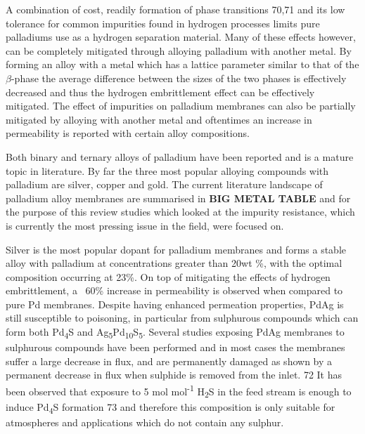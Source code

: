 A combination of cost, readily formation of phase transitions 70,71 and its low tolerance for 
common impurities found in hydrogen processes limits pure palladiums use as a hydrogen 
separation material. Many of these effects however, can be completely mitigated through 
alloying palladium with another metal. By forming an alloy with a metal which has a lattice 
parameter similar to that of the $\beta$-phase the average difference between the sizes of 
the two phases is effectively decreased and thus the hydrogen embrittlement effect can be 
effectively mitigated. The effect of impurities on palladium membranes can also be partially 
mitigated by alloying with another metal and oftentimes an increase in permeability is 
reported with certain alloy compositions. 

Both binary and ternary alloys of palladium have been reported and is a mature topic in 
literature. By far the three most popular alloying compounds with palladium are silver, 
copper and gold. The current literature landscape of palladium alloy membranes are summarised 
in \textbf{BIG METAL TABLE} and for the purpose of this review studies which looked at the impurity resistance, which 
is currently the most pressing issue in the field, were focused on. 

Silver is the most popular dopant for palladium membranes and forms a stable alloy with 
palladium at concentrations greater than 20wt \%, with the optimal composition occurring at 
23\%. On top of mitigating the effects of hydrogen embrittlement, a ~60\% increase in 
permeability is observed when compared to pure Pd membranes. Despite having enhanced 
permeation properties, PdAg is still susceptible to poisoning, in particular from sulphurous 
compounds which can form both Pd\textsubscript{4}S and Ag\textsubscript{5}Pd\textsubscript{10}S\textsubscript{5}. Several studies exposing PdAg membranes 
to sulphurous compounds have been performed and in most cases the membranes suffer a large 
decrease in flux, and are permanently damaged as shown by a permanent decrease in flux when 
sulphide is removed from the inlet. 72 It has been observed that exposure to 5 \textmu mol mol\textsuperscript{-1} H\textsubscript{2}S 
in the feed stream is enough to induce Pd\textsubscript{4}S formation 73 and therefore this composition is 
only suitable for atmospheres and applications which do not contain any sulphur. 

